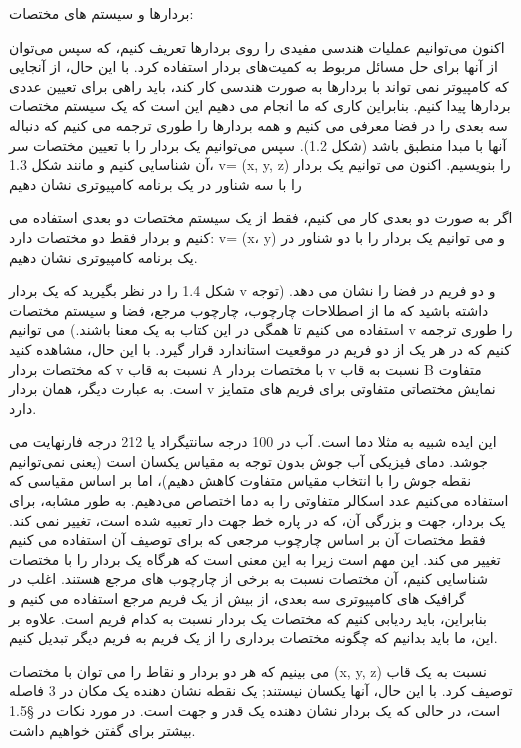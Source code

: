 {
بردارها و سیستم های مختصات:

اکنون می‌توانیم عملیات هندسی مفیدی را روی بردارها تعریف کنیم، که سپس می‌توان از آنها برای حل مسائل مربوط به کمیت‌های بردار استفاده کرد.
با این حال، از آنجایی که کامپیوتر نمی تواند با بردارها به صورت هندسی کار کند، باید راهی برای تعیین عددی بردارها پیدا کنیم.
بنابراین کاری که ما انجام می دهیم این است که یک سیستم مختصات سه بعدی را در فضا معرفی می کنیم و همه بردارها را طوری ترجمه می کنیم که دنباله آنها با مبدا منطبق باشد (شکل 1.2).
سپس می‌توانیم یک بردار را با تعیین مختصات سر آن شناسایی کنیم و مانند شکل 1.3، v= (x, y, z) را بنویسیم.
اکنون می توانیم یک بردار را با سه شناور در یک برنامه کامپیوتری نشان دهیم

اگر به صورت دو بعدی کار می کنیم، فقط از یک سیستم مختصات دو بعدی استفاده می کنیم و بردار فقط دو مختصات دارد: v= (x، y) و می توانیم یک بردار را با دو شناور در یک برنامه کامپیوتری نشان دهیم.

شکل 1.4 را در نظر بگیرید که یک بردار v و دو فریم در فضا را نشان می دهد. (توجه داشته باشید که ما از اصطلاحات چارچوب، چارچوب مرجع، فضا و سیستم مختصات استفاده می کنیم تا همگی در این کتاب به یک معنا باشند.)
می توانیم v را طوری ترجمه کنیم که در هر یک از دو فریم در موقعیت استاندارد قرار گیرد. با این حال، مشاهده کنید که مختصات بردار v نسبت به قاب A با مختصات بردار v نسبت به قاب B متفاوت است.
به عبارت دیگر، همان بردار v نمایش مختصاتی متفاوتی برای فریم های متمایز دارد.

این ایده شبیه به مثلا دما است. آب در 100 درجه سانتیگراد یا 212 درجه فارنهایت می جوشد.
دمای فیزیکی آب جوش بدون توجه به مقیاس یکسان است (یعنی نمی‌توانیم نقطه جوش را با انتخاب مقیاس متفاوت کاهش دهیم)، اما بر اساس مقیاسی که استفاده می‌کنیم عدد اسکالر متفاوتی را به دما اختصاص می‌دهیم.
به طور مشابه، برای یک بردار، جهت و بزرگی آن، که در پاره خط جهت دار تعبیه شده است، تغییر نمی کند.
فقط مختصات آن بر اساس چارچوب مرجعی که برای توصیف آن استفاده می کنیم تغییر می کند.
این مهم است زیرا به این معنی است که هرگاه یک بردار را با مختصات شناسایی کنیم، آن مختصات نسبت به برخی از چارچوب های مرجع هستند.
اغلب در گرافیک های کامپیوتری سه بعدی، از بیش از یک فریم مرجع استفاده می کنیم و بنابراین، باید ردیابی کنیم که مختصات یک بردار نسبت به کدام فریم است.
علاوه بر این، ما باید بدانیم که چگونه مختصات برداری را از یک فریم به فریم دیگر تبدیل کنیم.

می بینیم که هر دو بردار و نقاط را می توان با مختصات (x, y, z) نسبت به یک قاب توصیف کرد.
با این حال، آنها یکسان نیستند; یک نقطه نشان دهنده یک مکان در 3 فاصله است، در حالی که یک بردار نشان دهنده یک قدر و جهت است.
در مورد نکات در §1.5 بیشتر برای گفتن خواهیم داشت.
}

